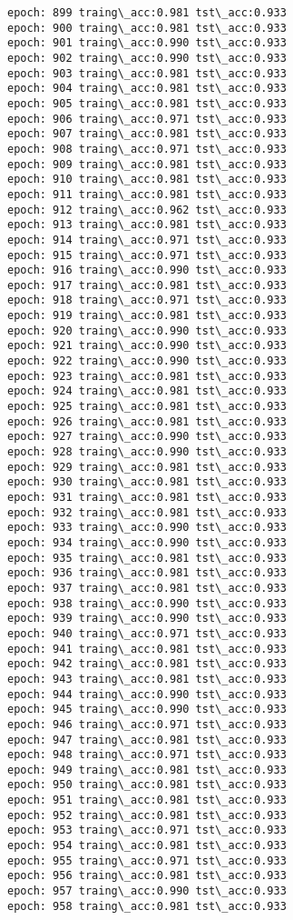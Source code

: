\documentclass[11pt]{article}
\begin{document}
\begin{Verbatim}[commandchars=\\\{\}]
epoch: 899 traing\_acc:0.981 tst\_acc:0.933
epoch: 900 traing\_acc:0.981 tst\_acc:0.933
epoch: 901 traing\_acc:0.990 tst\_acc:0.933
epoch: 902 traing\_acc:0.990 tst\_acc:0.933
epoch: 903 traing\_acc:0.981 tst\_acc:0.933
epoch: 904 traing\_acc:0.981 tst\_acc:0.933
epoch: 905 traing\_acc:0.981 tst\_acc:0.933
epoch: 906 traing\_acc:0.971 tst\_acc:0.933
epoch: 907 traing\_acc:0.981 tst\_acc:0.933
epoch: 908 traing\_acc:0.971 tst\_acc:0.933
epoch: 909 traing\_acc:0.981 tst\_acc:0.933
epoch: 910 traing\_acc:0.981 tst\_acc:0.933
epoch: 911 traing\_acc:0.981 tst\_acc:0.933
epoch: 912 traing\_acc:0.962 tst\_acc:0.933
epoch: 913 traing\_acc:0.981 tst\_acc:0.933
epoch: 914 traing\_acc:0.971 tst\_acc:0.933
epoch: 915 traing\_acc:0.971 tst\_acc:0.933
epoch: 916 traing\_acc:0.990 tst\_acc:0.933
epoch: 917 traing\_acc:0.981 tst\_acc:0.933
epoch: 918 traing\_acc:0.971 tst\_acc:0.933
epoch: 919 traing\_acc:0.981 tst\_acc:0.933
epoch: 920 traing\_acc:0.990 tst\_acc:0.933
epoch: 921 traing\_acc:0.990 tst\_acc:0.933
epoch: 922 traing\_acc:0.990 tst\_acc:0.933
epoch: 923 traing\_acc:0.981 tst\_acc:0.933
epoch: 924 traing\_acc:0.981 tst\_acc:0.933
epoch: 925 traing\_acc:0.981 tst\_acc:0.933
epoch: 926 traing\_acc:0.981 tst\_acc:0.933
epoch: 927 traing\_acc:0.990 tst\_acc:0.933
epoch: 928 traing\_acc:0.990 tst\_acc:0.933
epoch: 929 traing\_acc:0.981 tst\_acc:0.933
epoch: 930 traing\_acc:0.981 tst\_acc:0.933
epoch: 931 traing\_acc:0.981 tst\_acc:0.933
epoch: 932 traing\_acc:0.981 tst\_acc:0.933
epoch: 933 traing\_acc:0.990 tst\_acc:0.933
epoch: 934 traing\_acc:0.990 tst\_acc:0.933
epoch: 935 traing\_acc:0.981 tst\_acc:0.933
epoch: 936 traing\_acc:0.981 tst\_acc:0.933
epoch: 937 traing\_acc:0.981 tst\_acc:0.933
epoch: 938 traing\_acc:0.990 tst\_acc:0.933
epoch: 939 traing\_acc:0.990 tst\_acc:0.933
epoch: 940 traing\_acc:0.971 tst\_acc:0.933
epoch: 941 traing\_acc:0.981 tst\_acc:0.933
epoch: 942 traing\_acc:0.981 tst\_acc:0.933
epoch: 943 traing\_acc:0.981 tst\_acc:0.933
epoch: 944 traing\_acc:0.990 tst\_acc:0.933
epoch: 945 traing\_acc:0.990 tst\_acc:0.933
epoch: 946 traing\_acc:0.971 tst\_acc:0.933
epoch: 947 traing\_acc:0.981 tst\_acc:0.933
epoch: 948 traing\_acc:0.971 tst\_acc:0.933
epoch: 949 traing\_acc:0.981 tst\_acc:0.933
epoch: 950 traing\_acc:0.981 tst\_acc:0.933
epoch: 951 traing\_acc:0.981 tst\_acc:0.933
epoch: 952 traing\_acc:0.981 tst\_acc:0.933
epoch: 953 traing\_acc:0.971 tst\_acc:0.933
epoch: 954 traing\_acc:0.981 tst\_acc:0.933
epoch: 955 traing\_acc:0.971 tst\_acc:0.933
epoch: 956 traing\_acc:0.981 tst\_acc:0.933
epoch: 957 traing\_acc:0.990 tst\_acc:0.933
epoch: 958 traing\_acc:0.981 tst\_acc:0.933

\end{Verbatim}
\end{document}
